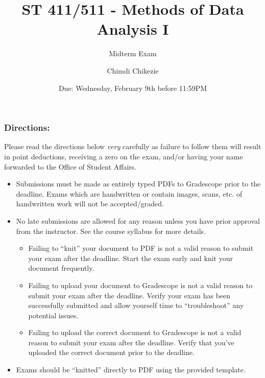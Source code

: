 \documentclass[
]{article}
\title{ST 411/511 - Methods of Data Analysis I}
\subtitle{Midterm Exam}
\author{Chimdi Chikezie}
\date{Due: Wednesday, February 9th before 11:59PM}
\providecommand{\tightlist}{%
  \setlength{\itemsep}{0pt}\setlength{\parskip}{0pt}}
\begin{document}
\maketitle

\hypertarget{directions}{%
\subsubsection{Directions:}\label{directions}}

Please read the directions below \emph{very} carefully as failure to
follow them will result in point deductions, receiving a zero on the
exam, and/or having your name forwarded to the Office of Student
Affairs.

\begin{itemize}
\tightlist
\item
  Submissions must be made as entirely typed PDFs to Gradescope prior to
  the deadline. Exams which are handwritten or contain images, scans,
  etc. of handwritten work will not be accepted/graded.
\item
  No late submissions are allowed for any reason unless you have prior
  approval from the instructor. See the course syllabus for more
  details.

  \begin{itemize}
  \tightlist
  \item
    Failing to ``knit'' your document to PDF is not a valid reason to
    submit your exam after the deadline. Start the exam early and knit
    your document frequently.
  \item
    Failing to upload your document to Gradescope is not a valid reason
    to submit your exam after the deadline. Verify your exam has been
    successfully submitted and allow yourself time to ``troubleshoot''
    any potential issues.
  \item
    Failing to upload the correct document to Gradescope is not a valid
    reason to submit your exam after the deadline. Verify that you've
    uploaded the correct document prior to the deadline.
  \end{itemize}
\item
  Exams should be ``knitted'' directly to PDF using the provided
  template.


\end{itemize}
\end{document}
